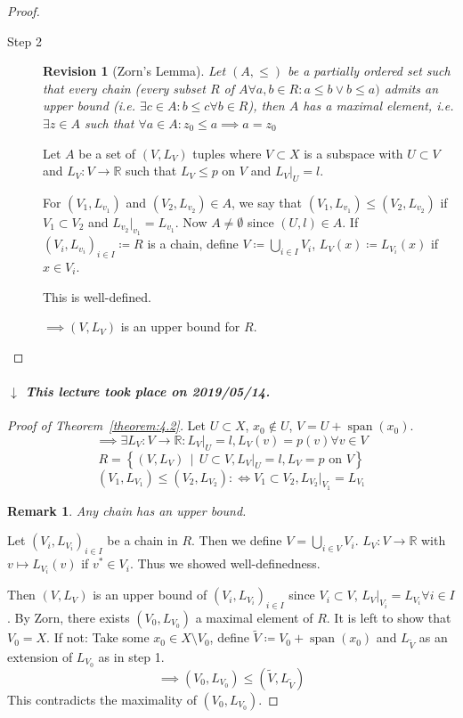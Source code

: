 \documentclass[a4paper]{article}
\newcounter{lecref}[section]
\numberwithin{lecref}{section}
\newtheorem*{Remark}{Remark}
\newtheorem{revision}[lecref]{Revision}
\newcommand{\SetDef}[2]{\left\{#1\,\mid\,#2\right\}}
\newcommand{\dateref}[1]{%
  \begin{mdframed}[backgroundcolor=gray!10,innerbottommargin=0pt,innertopmargin=0pt]
    \paragraph{\textit{$\downarrow$ This lecture took place on #1.}}%
  \end{mdframed}%
}
\begin{document}
\begin{proof}
\begin{description}
		\item[Step 2]
			\begin{revision}[Zorn's Lemma]
				Let $(A, \leq)$ be a partially ordered set such that every chain (every subset $R$ of $A \forall a, b \in R: a \leq b \lor b \leq a)$ admits an upper bound (i.e. $\exists c \in A: b \leq c \forall b \in R$), then $A$ has a maximal element, i.e. $\exists z \in A$ such that $\forall a \in A: z_0 \leq a \implies a = z_0$
			\end{revision}

			Let $A$ be a set of $(V, L_V)$ tuples where $V \subset X$ is a subspace with $U \subset V$ and $L_V: V \to \mathbb R$ such that $L_V \leq p$ on $V$ and $L_V|_U = l$.

			For $(V_1, L_{v_1})$ and $(V_2, L_{v_2}) \in A$, we say that $(V_1, L_{v_1}) \leq (V_2, L_{v_2})$ if $V_1 \subset V_2$ and $L_{v_2}|_{v_1} = L_{v_1}$. Now $A \neq \emptyset$ since $(U, l) \in A$. If $(V_i, L_{v_i})_{i \in I} \coloneqq R$ is a chain, define $V \coloneqq \bigcup_{i \in I} V_i$, $L_V(x) \coloneqq L_{V_i}(x)$ if $x \in V_i$.

			This is well-defined.

			$\implies (V, L_V)$ is an upper bound for $R$.
	\end{description}
\end{proof}

\dateref{2019/05/14}

\begin{proof}[Proof of Theorem~\ref{theorem:4.2}]
	Let $U \subset X$, $x_0 \not\in U$, $V = U + \operatorname{span}(x_0)$.
	\[ \implies \exists L_V: V \to \mathbb R: L_V|_U = l, L_V(v) = p(v) \forall v \in V \]
	\[ R = \SetDef{(V, L_V)}{U \subset V, L_V|_U = l, L_V = p \text{ on } V} \]
	\[ (V_1, L_{V_1}) \leq (V_2, L_{V_2}) :\iff V_1 \subset V_2, L_{V_2}|_{V_1} = L_{V_1} \]
	\begin{Remark} Any chain has an upper bound. \end{Remark}
	Let $(V_i, L_{V_i})_{i \in I}$ be a chain in $R$. Then we define $V = \bigcup_{i \in V} V_i$.
	$L_V: V \to \mathbb R$ with $v \mapsto L_{V_i}(v)$ if $v^* \in V_i$. Thus we showed well-definedness.

	Then $(V, L_V)$ is an upper bound of $(V_i, L_{V_i})_{i \in I}$ since $V_i \subset V$, $L_V|_{V_i} = L_{V_i} \forall i \in I$.
	By Zorn, there exists $(V_0, L_{V_0})$ a maximal element of $R$. It is left to show that $V_0 = X$.
	If not: Take some $x_0 \in X \setminus V_0$, define $\tilde V \coloneqq V_0 + \operatorname{span}(x_0)$ and $L_{\tilde V}$ as an extension of $L_{V_0}$ as in step 1.
	\[ \implies (V_0, L_{V_0}) \leq (\tilde V, L_{\tilde V}) \]
	This contradicts the maximality of $(V_0, L_{V_0})$.
\end{proof}
\end{document}
